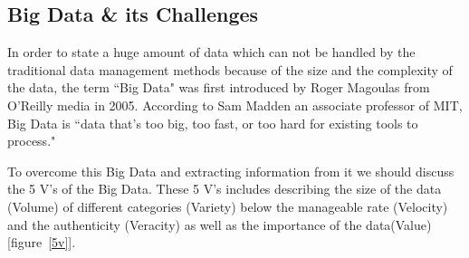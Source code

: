 \subsection{Big Data \& its Challenges}
\label{int:Challenges} 
In order to state a huge amount of data which can not be handled by the traditional data management methods because of the size and the complexity of the data, the term ``Big Data" was first introduced by Roger Magoulas from O’Reilly media in 2005. According to Sam Madden an associate professor of MIT, Big Data is ``data that's too big, too fast, or too hard for existing tools to process."  



To overcome this Big Data and extracting information from it we should discuss the 5 V's of the Big Data. These 5 V's includes describing the size of the data (Volume) of different categories (Variety) below the manageable rate (Velocity) and the authenticity (Veracity) as well as the importance of the data(Value) [figure~\ref{5v}].



\begin{figure}
\centering
{}
\end{figure}

